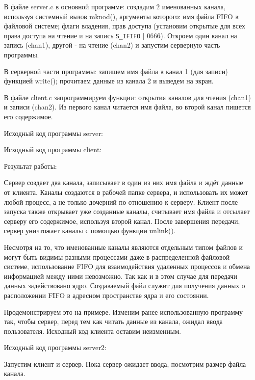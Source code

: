 \documentclass[a4paper]{article}
\begin{document}
	В файле server.c в основной программе: создадим 2 именованных канала, используя системный вызов mknod(), аргументы которого: имя файла FIFO в файловой системе; флаги владения, прав доступа (установим открытые для всех права доступа на чтение и на запись \texttt{S\_IFIFO} | 0666). Откроем один канал на запись (chan1), другой - на чтение (chan2) и запустим серверную часть программы.
	
	В серверной части программы: запишем имя файла в канал 1 (для записи) функцией write(); прочитаем данные из канала 2 и выведем на экран.

	В файле client.c запрограммируем функции: открытия каналов для чтения (chan1) и записи (chan2). Из первого канал читается имя файла, во второй канал пишется его содержимое.
	
	Исходный код программы server:
	
		
	Исходный код программы client:
	
	
	Результат работы:
	
	
	Сервер создает два канала, записывает в один из них имя файла и ждёт данные от клиента. Каналы создаются в рабочей папке сервера, и использовать их может любой процесс, а не только дочерний по отношению к серверу. Клиент после запуска также открывает уже созданные каналы, считывает имя файла и отсылает серверу его содержимое, используя второй канал. После завершения передачи, сервер уничтожает каналы с помощью функции unlink().
	
	Несмотря на то, что именованные каналы являются отдельным типом файлов и могут быть видимы разными процессами даже в распределенной файловой системе, использование FIFO для взаимодействия удаленных процессов и обмена информацией между ними невозможно. Так как и в этом случае для передачи данных задействовано ядро. Создаваемый файл служит для получения данных о расположении FIFO в адресном пространстве ядра и его состоянии.
	
	Продемонстрируем это на примере. Изменим ранее использованную программу так, чтобы сервер, перед тем как читать данные из канала, ожидал ввода пользователя. Исходный код клиента оставим неизменным.

	Исходный код программы server2:
	

	Запустим клиент и сервер. Пока сервер ожидает ввода, посмотрим размер файла канала.
	
 	
\end{document}
